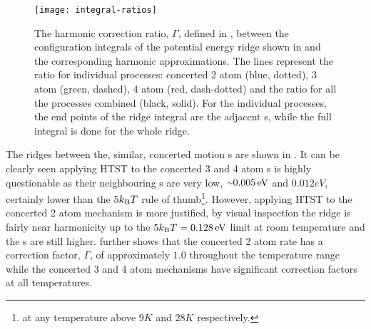 \begin{figure}[hb]
\begin{center}
\texttt{[image: integral-ratios]}
\caption{
The harmonic correction ratio, $\Gamma$, defined in ,
between the configuration integrals of the potential energy ridge shown in  and the corresponding harmonic approximations.
The lines represent the ratio for individual processes: concerted 2 atom (blue, dotted), 3 atom (green, dashed), 4 atom (red, dash-dotted) and the ratio for all the processes combined (black, solid).
For the individual processes, the end points of the ridge integral are the adjacent s, while the full integral is done for the whole ridge.
}
\label{fig:integral-ratios}
\end{center}
\end{figure}

The ridges between the, similar, concerted motion s are shown in .
It can be clearly seen applying HTST to the concerted 3 and 4 atom s is highly questionable as their neighbouring s are very low, $\mytilde 0.005\unit{eV}$ and $0.012\unit{eV}$, certainly lower than the $5k_\text{B} T$ rule of thumb\footnote{at any temperature above $9\unit{K}$ and $28\unit{K}$ respectively.}.
However, applying HTST to the concerted 2 atom mechanism is more justified, by visual inspection the ridge is fairly near harmonicity up to the $5k_\text{B} T = 0.128\, \mathrm{eV}$ limit at room temperature and the s are still higher.
 further shows that the concerted 2 atom rate has a correction factor, $\Gamma$, of approximately $1.0$ throughout the temperature range while the concerted 3 and 4 atom mechanisms have significant correction factors at all temperatures.

